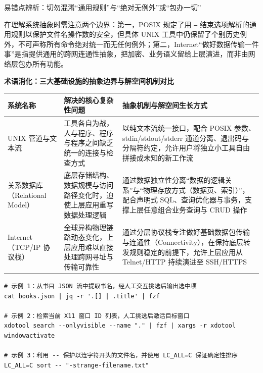 \documentclass[UTF8,a4paper,11pt,fontset=fandol]{ctexart}
\begin{document}
\begin{warningbox}{易错点辨析：切勿混淆“通用规则”与“绝对无例外”或“包办一切”}

在理解系统抽象时需注意两个边界：第一，POSIX 规定了用 \texttt{--} 结束选项解析的通用规则以保护文件名操作数的安全，但具体 UNIX 工具中仍保留了个别历史例外，不可声称所有命令绝对统一而无任何例外；第二，Internet“做好数据传输一件事”是指提供通用的跨网连通性抽象，把加密、业务语义留给上层演进，而非由网络层包办所有功能。

\end{warningbox}

\par{}\textbf{术语消化：三大基础设施的抽象边界与解空间机制对比}

\begin{center}\small\begin{tabularx}{\linewidth}{YYY}

\toprule

系统名称 & 解决的核心复杂性问题 & 抽象机制与解空间生长方式\\\midrule

UNIX 管道与文本流 & 工具各自为战，人与程序、程序与程序之间缺乏统一的连接与检查方式 & 以纯文本流统一接口，配合 POSIX 参数、stdin/stdout/stderr 通道分离、退出码与分隔符约定，允许用户将独立小工具自由拼接成未知的新工作流\\[3pt]

关系数据库（Relational Model） & 底层存储结构、数据规模与访问路径变化时，迫使上层应用重写数据处理逻辑 & 通过数据独立性分离“数据的逻辑关系”与“物理存放方式（数据页、索引）”，配合声明式 SQL、查询优化器与事务，支撑上层任意组合业务查询与 CRUD 操作\\[3pt]

Internet（TCP/IP 协议栈） & 全球异构物理链路动态变化，上层应用难以直接处理跨网寻址与传输可靠性 & 通过分层协议栈专注做好基础数据包传输与连通性（Connectivity），在保持底层转发规则稳定的前提下，允许上层应用从 Telnet/HTTP 持续演进至 SSH/HTTPS\\[3pt]

\bottomrule\end{tabularx}\end{center}

\begin{lstlisting}[basicstyle={\ttfamily\small\linespread{1}\selectfont},captionpos=t,caption={组合现代命令行工具构建交互式流水线}]
# 示例 1：从书目 JSON 流中提取书名，经人工交互挑选后输出选中项
cat books.json | jq -r '.[] | .title' | fzf

# 示例 2：检索当前 X11 窗口 ID 列表，人工挑选后激活目标窗口
xdotool search --onlyvisible --name "." | fzf | xargs -r xdotool windowactivate

# 示例 3：利用 -- 保护以连字符开头的文件名，并使用 LC_ALL=C 保证确定性排序
LC_ALL=C sort -- "-strange-filename.txt"
\end{lstlisting}
\end{document}
